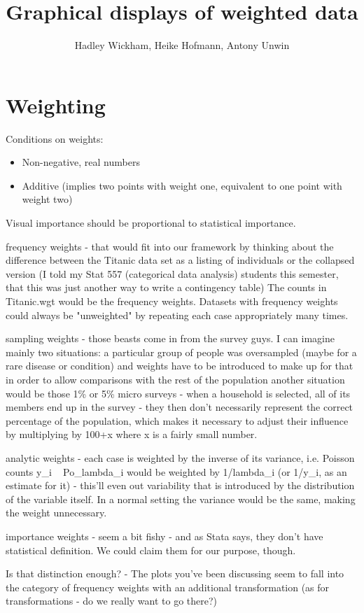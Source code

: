 \documentclass[oneside,letterpaper]{scrartcl}
\title{Graphical displays of weighted data}
\author{Hadley Wickham, Heike Hofmann, Antony Unwin}
\begin{document}
\section{Weighting}\label{sec:introduction}

Conditions on weights:

\begin{itemize}
  \item Non-negative, real numbers
  \item Additive (implies two points with weight one, equivalent to one point with weight two)
\end{itemize}

Visual importance should be proportional to statistical importance.

frequency weights 
- that would fit into our framework by thinking about the difference between the Titanic data set as a listing of individuals or the collapsed version (I told my Stat 557 (categorical data analysis) students this semester, that this was just another way to write a contingency table) The counts in Titanic.wgt would be the frequency weights.
Datasets with frequency weights could always be "unweighted" by repeating each case appropriately many times.

sampling weights
- those beasts come in from the survey guys. I can imagine mainly two situations:
 a particular group of people was oversampled (maybe for a rare disease or condition) and weights have to be introduced to make up for that in order to allow comparisons with the rest of the population
another situation would be those 1\% or 5\% micro surveys - when a household is selected, all of its members end up in the survey - they then don't necessarily represent the correct percentage of the population, which makes it necessary to adjust their influence by multiplying by 100+x where x is a fairly small number.

analytic weights 
- each case is weighted by the inverse of its variance, i.e. Poisson counts y_i ~ Po_lambda_i would be weighted by 1/lambda_i (or 1/y_i, as an estimate for it) - this'll even out variability that is introduced by the distribution of the variable itself. In a normal setting the variance would be the same, making the weight unnecessary.

importance weights
- seem a bit fishy - and as Stata says, they don't have statistical definition. We could claim them for our purpose, though.

Is that distinction enough? - The plots you've been discussing seem to fall into the category of frequency weights with an additional transformation (as for transformations - do we really want to go there?)
\end{document}
